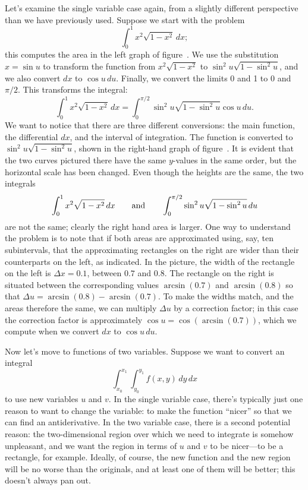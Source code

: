 Let's examine the single variable case again, from a slightly
different perspective than we have previously used.
Suppose we start with the problem
$$\int_0^1 x^2\sqrt{1-x^2}\,dx;$$
this computes the area in the left graph of 
figure~.
We use the substitution $x=\sin u$ to transform the function from 
$x^2\sqrt{1-x^2}$ to $\sin^2u\sqrt{1-\sin^2u}$, and we also convert
$dx$ to $\cos u\,du$. Finally, we convert the
limits 0 and 1 to 0 and $\pi/2$.
This transforms the integral:
$$\int_0^1 x^2\sqrt{1-x^2}\,dx = 
\int_0^{\pi/2}\sin^2u\sqrt{1-\sin^2u} \cos u\,du.$$
We want to notice that there are three different conversions: the
main function, the differential $dx$, and the interval of
integration. The function is converted to
$\sin^2u\sqrt{1-\sin^2u}$, shown in the right-hand graph of 
figure~. It is evident that the two
curves pictured there have the same $y$-values in the same order, but
the horizontal scale has been changed. Even though the heights are the
same, the two integrals
$$\int_0^1 x^2\sqrt{1-x^2}\,dx\qquad\hbox{and}\qquad
\int_0^{\pi/2}\sin^2u\sqrt{1-\sin^2u}\,du
$$
are not the same; clearly the right hand area is larger. One way to
understand the problem is to note that if both areas are approximated
using, say, ten subintervals, that the approximating rectangles on the
right are wider than their counterparts on the left, as indicated. In
the picture, the width of the rectangle on the left is $\Delta x=0.1$,
between $0.7$ and $0.8$.  The rectangle on the right is situated
between the corresponding values $\arcsin(0.7)$ and $\arcsin(0.8)$ so
that $\Delta u=\arcsin(0.8)-\arcsin(0.7)$. To
make the widths match, and the areas therefore the same, we can
multiply $\Delta u$ by a correction factor; in this case the
correction factor is approximately $\cos u=\cos(\arcsin(0.7))$, which
we compute when we convert $dx$ to $\cos u\,du$.


Now let's move to functions of two variables. Suppose we want to
convert an integral
$$\int_{x_0}^{x_1}\int_{y_0}^{y_1} f(x,y)\,dy\,dx$$ 
to use new variables $u$ and $v$. In the single variable case, there's
typically just one reason to want to change the variable: to make the
function ``nicer'' so that we can find an antiderivative. In the two
variable case, there is a second potential reason: the two-dimensional
region over which we need to integrate is somehow unpleasant, and we
want the region in terms of $u$ and $v$ to be nicer---to be a
rectangle, for example. Ideally, of course, the new function and the
new region will be no worse than the originals, and at least one of
them will be better; this doesn't always pan out.

